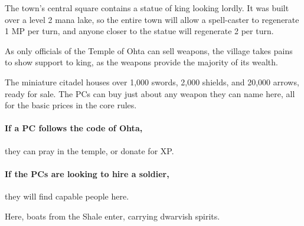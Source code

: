\begin{multicols}{2}
\label{lakeSquare}

The town's central square contains a statue of \gls{king} looking lordly.
It was built over a level 2 mana lake, so the entire town will allow a spell-caster to regenerate 1 MP per turn, and anyone closer to the statue will regenerate 2 per turn.

As only officials of the Temple of Ohta can sell weapons, the village takes pains to show support to \gls{king}, as the weapons provide the majority of its wealth.

\label{lakeTemple}

The miniature citadel houses over 1,000 swords, 2,000 shields, and 20,000 arrows, ready for sale.
The PCs can buy just about any weapon they can name here, all for the basic prices in the core rules.

\paragraph{If a PC follows the code of Ohta,}
they can pray in the temple, or donate for XP.

\paragraph{If the PCs are looking to hire a soldier,}
they will find capable people here.

\label{lakeDocks}

Here, boats from the Shale enter, carrying dwarvish spirits.

\end{multicols}

